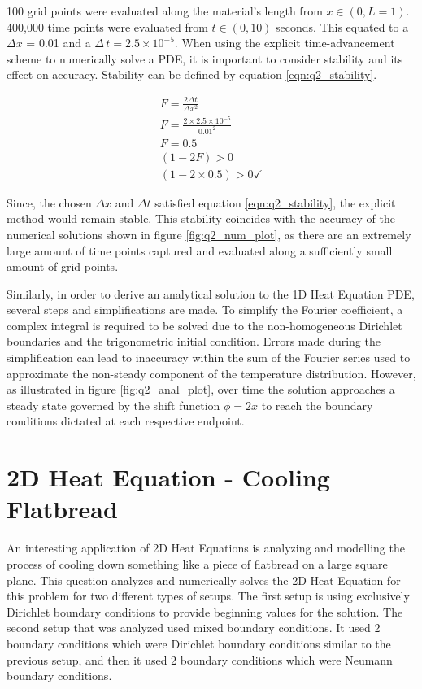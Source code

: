 \documentclass[12pt]{article}
\begin{document}
100 grid points were evaluated along the material's length from $x \in (0,L=1)$. 400,000 time points were evaluated from $t \in (0,10)$ seconds. This equated to a $\Delta x$ = 0.01 and a $\Delta\,t = 2.5\times10^{-5}$. When using the explicit time-advancement scheme to numerically solve a PDE, it is important to consider stability and its effect on accuracy. Stability can be defined by equation \ref{eqn:q2_stability}.

\begin{equation}
    \label{eqn:q2_stability}
    \begin{gathered}
        F = \frac{2 \Delta t}{\Delta x^2} \\
        F = \frac{2 \times 2.5\times10^{-5}}{0.01^2} \\
        F = 0.5 \\
        (1 - 2F) > 0 \\
        (1 - 2\times0.5) > 0 \checkmark
    \end{gathered}
\end{equation}

Since, the chosen $\Delta x$ and $\Delta t$ satisfied equation \ref{eqn:q2_stability}, the explicit method would remain stable. This stability coincides with the accuracy of the numerical solutions shown in figure \ref{fig:q2_num_plot}, as there are an extremely large amount of time points captured and evaluated along a sufficiently small amount of grid points. 

Similarly, in order to derive an analytical solution to the 1D Heat Equation PDE, several steps and simplifications are made. To simplify the Fourier coefficient, a complex integral is required to be solved due to the non-homogeneous Dirichlet boundaries and the trigonometric initial condition. Errors made during the simplification can lead to inaccuracy within the sum of the Fourier series used to approximate the non-steady component of the temperature distribution. However, as illustrated in figure \ref{fig:q2_anal_plot}, over time the solution approaches a steady state governed by the shift function $\phi = 2 x$ to reach the boundary conditions dictated at each respective endpoint.

\clearpage
\section{2D Heat Equation - Cooling Flatbread}

An interesting application of 2D Heat Equations is analyzing and modelling the process of cooling down something like a piece of flatbread on a large square plane. This question analyzes and numerically solves the 2D Heat Equation for this problem for two different types of setups. The first setup is using exclusively Dirichlet boundary conditions to provide beginning values for the solution. The second setup that was analyzed used mixed boundary conditions. It used 2 boundary conditions which were Dirichlet boundary conditions similar to the previous setup, and then it used 2 boundary conditions which were Neumann boundary conditions. 
\end{document}
